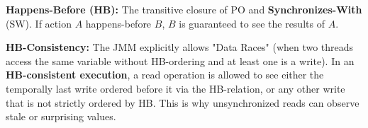 \begin{definition} 
    \textbf{Happens-Before (HB):} The transitive closure of PO and \textbf{Synchronizes-With} (SW). If action $A$ happens-before $B$, $B$ is guaranteed to see the results of $A$.
\end{definition}

\begin{remark}
    \textbf{HB-Consistency:} The JMM explicitly allows "Data Races" (when two threads access the same variable without HB-ordering and at least one is a write). In an \textbf{HB-consistent execution}, a read operation is allowed to see either the temporally last write ordered before it via the HB-relation, or any other write that is not strictly ordered by HB. This is why unsynchronized reads can observe stale or surprising values.
\end{remark}